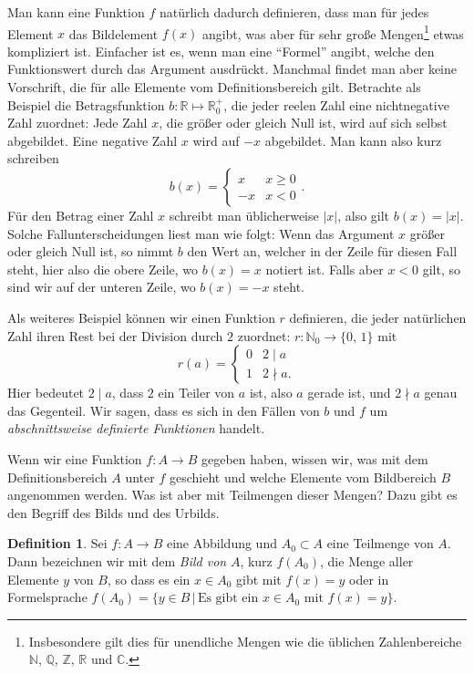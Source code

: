 \documentclass[a4paper,ngerman,12pt]{zirkelblatt1415}
\theoremstyle{definition}
\newtheorem{definition}{Definition}
\theoremstyle{remark}
\newcommand{\RR}{\mathbb{R}}
\newcommand{\CC}{\mathbb{C}}
\newcommand{\ZZ}{\mathbb{Z}}
\renewcommand{\NN}{\mathbb{N}}
\newcommand{\QQ}{\mathbb{Q}}
\newcommand{\lra}{\longrightarrow}
\begin{document}
Man kann eine Funktion $f$ natürlich dadurch definieren, dass man für jedes Element $x$ das Bildelement $f(x)$ angibt, was aber für sehr große Mengen\footnote{Insbesondere gilt dies für unendliche Mengen wie die üblichen Zahlenbereiche $\NN$, $\QQ$, $\ZZ$, $\RR$ und $\CC$.} etwas kompliziert ist. Einfacher ist es, wenn man eine "`Formel"' angibt, welche den Funktionswert durch das Argument ausdrückt. Manchmal findet man aber keine Vorschrift, die für alle Elemente vom Definitionsbereich gilt. Betrachte als Beispiel die Betragsfunktion $b:\mathbb{R} \mapsto \mathbb{R}^+_0$, die jeder reelen Zahl eine nichtnegative Zahl zuordnet: Jede Zahl $x$, die größer oder gleich Null ist, wird auf sich selbst abgebildet. Eine negative Zahl $x$ wird auf $-x$ abgebildet. Man kann also kurz schreiben
\[ b(x) =\begin{cases} 
      x & x\geq 0 \\
      -x & x < 0
   \end{cases}.
\]
Für den Betrag einer Zahl $x$ schreibt man üblicherweise $|x|$, also gilt $b(x)=|x|$. Solche Fallunterscheidungen liest man wie folgt: Wenn das Argument $x$ größer oder gleich Null ist, so nimmt $b$ den Wert an, welcher in der Zeile für diesen Fall steht, hier also die obere Zeile, wo $b(x)=x$ notiert ist. Falls aber $x<0$ gilt, so sind wir auf der unteren Zeile, wo $b(x)=-x$ steht.

Als weiteres Beispiel können wir einen Funktion $r$ definieren, die jeder natürlichen Zahl ihren Rest bei der Division durch $2$ zuordnet: $r:\mathbb{N}_0 \longrightarrow \{0\text{, }1\}$ mit
\[ r(a) = 
\begin{cases}
0 & 2\mid a \\
1 & 2\nmid a.
\end{cases}
\]
Hier bedeutet $2 \mid a$, dass $2$ ein Teiler von $a$ ist, also $a$ gerade ist, und $2\nmid a$ genau das Gegenteil. Wir sagen, dass es sich in den Fällen von $b$ und $f$ um \emph{abschnittsweise definierte Funktionen} handelt.

Wenn wir eine Funktion $f:A\lra B$ gegeben haben, wissen wir, was mit dem Definitionsbereich $A$ unter $f$ geschieht und welche Elemente vom Bildbereich $B$ angenommen werden. Was ist aber mit Teilmengen dieser Mengen? Dazu gibt es den Begriff des Bilds und des Urbilds.

\begin{definition}
Sei $f:A\longrightarrow B$ eine Abbildung und $A_0\subset A$ eine Teilmenge von $A$. Dann bezeichnen wir mit dem \emph{Bild von} $A$, kurz $f(A_0)$, die Menge aller Elemente 
$y$ von $B$, so dass es ein $x\in A_0$ gibt mit $f(x)=y$ oder in Formelsprache
$f(A_0) = \{y\in B\,|\,\text{Es gibt ein } x\in A_0 \text{ mit } f(x) =y\}.$ 
\end{definition}
\end{document}
